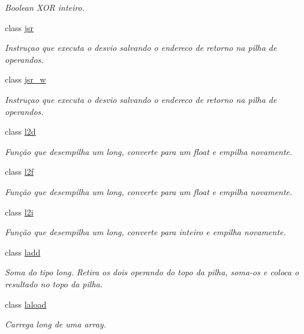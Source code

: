 \begin{DoxyCompactItemize}
\begin{DoxyCompactList}\small\item\em Boolean X\+OR inteiro. \end{DoxyCompactList}\item 
class \hyperlink{class_instruction_impl_1_1jsr}{jsr}
\begin{DoxyCompactList}\small\item\em Instruçao que executa o desvio salvando o endereco de retorno na pilha de operandos. \end{DoxyCompactList}\item 
class \hyperlink{class_instruction_impl_1_1jsr__w}{jsr\+\_\+w}
\begin{DoxyCompactList}\small\item\em Instruçao que executa o desvio salvando o endereco de retorno na pilha de operandos. \end{DoxyCompactList}\item 
class \hyperlink{class_instruction_impl_1_1l2d}{l2d}
\begin{DoxyCompactList}\small\item\em Função que desempilha um long, converte para um float e empilha novamente. \end{DoxyCompactList}\item 
class \hyperlink{class_instruction_impl_1_1l2f}{l2f}
\begin{DoxyCompactList}\small\item\em Função que desempilha um long, converte para um float e empilha novamente. \end{DoxyCompactList}\item 
class \hyperlink{class_instruction_impl_1_1l2i}{l2i}
\begin{DoxyCompactList}\small\item\em Função que desempilha um long, converte para inteiro e empilha novamente. \end{DoxyCompactList}\item 
class \hyperlink{class_instruction_impl_1_1ladd}{ladd}
\begin{DoxyCompactList}\small\item\em Soma do tipo long. Retira os dois operando do topo da pilha, soma-\/os e coloca o resultado no topo da pilha. \end{DoxyCompactList}\item 
class \hyperlink{class_instruction_impl_1_1laload}{laload}
\begin{DoxyCompactList}\small\item\em Carrega long de uma array. \end{DoxyCompactList}\item 

\end{DoxyCompactItemize}
